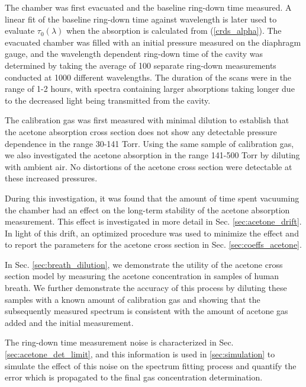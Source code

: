 \documentclass[12pt]{report}
\begin{document}
	The chamber was first evacuated and the baseline ring-down time measured. A linear fit of the baseline ring-down time against wavelength is later used to evaluate $\tau_0 (\lambda)$ when the absorption is calculated from (\ref{crds_alpha}). The evacuated chamber was filled with an initial pressure measured on the diaphragm gauge, and the wavelength dependent ring-down time of the cavity was determined by taking the average of 100 separate ring-down measurements conducted at 1000 different wavelengths. The duration of the scans were in the range of 1-2 hours, with spectra containing larger absorptions taking longer due to the decreased light being transmitted from the cavity.
	
	The calibration gas was first measured with minimal dilution to establish that the acetone absorption cross section does not show any detectable pressure dependence in the range 30-141 Torr. Using the same sample of calibration gas, we also investigated the acetone absorption in the range 141-500 Torr by diluting with ambient air. No distortions of the acetone cross section were detectable at these increased pressures.
	
	During this investigation, it was found that the amount of time spent vacuuming the chamber had an effect on the long-term stability of the acetone absorption measurement. This effect is investigated in more detail in Sec. \ref{sec:acetone_drift}. In light of this drift, an optimized procedure was used to minimize the effect and to report the parameters for the acetone cross section in Sec. \ref{sec:coeffs_acetone}.
	
	In Sec. \ref{sec:breath_dilution}, we demonstrate the utility of the acetone cross section model by measuring the acetone concentration in samples of human breath. We further demonstrate the accuracy of this process by diluting these samples with a known amount of calibration gas and showing that the subsequently measured spectrum is consistent with the amount of acetone gas added and the initial measurement.
	
	The ring-down time measurement noise is characterized in Sec. \ref{sec:acetone_det_limit}, and this information is used in \ref{sec:simulation} to simulate the effect of this noise on the spectrum fitting process and quantify the error which is propagated to the final gas concentration determination.
	
\end{document}
